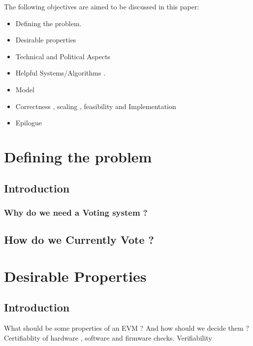 \documentclass[12pt]{report}
\begin{document}
\vspace{0.5cm}

The following objectives are aimed to be discussed in this paper:
\begin{itemize}
  \item
  Defining the problem.
  \item
  Desirable properties 
  \item
  Technical and Political Aspects
  \item
  Helpful Systems/Algorithms .
  \item
  Model  
  \item
  Correctness , scaling , feasibility and Implementation
  \item 
  Epilogue
\end{itemize}

\chapter{Defining the problem}
\section{Introduction}
\subsection{Why do we need a Voting system ?}
\section{How do we Currently Vote ?}

\chapter{Desirable Properties}
\section{Introduction}
What should be some properties of an EVM ? And how should we decide them ?
Certifiablity of hardware , software and firmware checks. Verifiability
\end{document}
